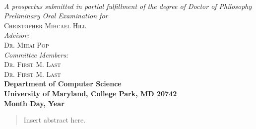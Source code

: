 \documentclass{article}
\begin{document}
 




\begin{titlepage}
\begin{center}

\textsc{\huge \bfseries {}}\\
 
\emph{A prospectus submitted in partial fulfillment of the degree of Doctor of
Philosophy}\\[5.5cm]


\emph{Preliminary Oral Examination for}\\
\textsc{\large Christopher Mihcael Hill}\\[2.0cm] %
\emph{Advisor:} \\
\textsc{Dr. Mihai Pop}\\[.5cm]
\emph{Committee Members:}\\
\textsc{Dr. First M. Last}\\
\textsc{Dr. First M. Last}\\[4.0cm]

{\bfseries Department of Computer Science}\\
{\bfseries University of Maryland, College Park, MD 20742}\\
{\bfseries Month Day, Year}
\vfill

\end{center}
\end{titlepage}

\newpage
\thispagestyle{empty}
\mbox{}


\newpage
\setcounter{page}{1}
\doublespacing
\begin{abstract}

Insert abstract here.

\end{abstract}

\newpage
\tableofcontents

\newpage
\listoffigures

\newpage
\doublespacing



\end{document}
